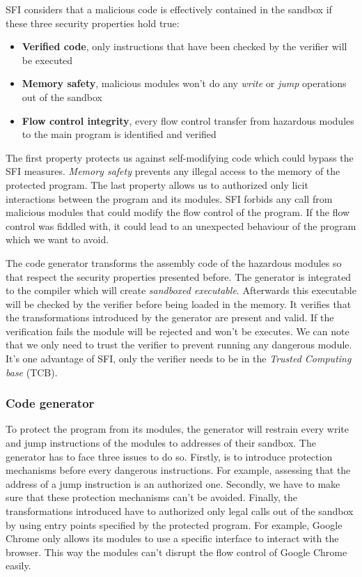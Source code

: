 \documentclass[11pt]{sdm}
\begin{document}
SFI considers that a malicious code is effectively contained in the sandbox if these three security properties hold true:
\begin{itemize}
	\item \textbf{Verified code}, only instructions that have been checked by the verifier will be executed 
	\item \textbf{Memory safety}, malicious modules won't do any \textit{write} or \textit{jump} operations out of the sandbox
	\item \textbf{Flow control integrity}, every flow control transfer from hazardous modules to the main program is identified and verified
\end{itemize}
The first property protects us against self-modifying code which could bypass the SFI measures. \textit{Memory safety} prevents any illegal access to the memory of the protected program. The last property allows us to authorized only licit interactions between the program and its modules. SFI forbids any call from malicious modules that could modify the flow control of the program. If the flow control was fiddled with, it could lead to an unexpected behaviour of the program which we want to avoid.

The code generator transforms the assembly code of the hazardous modules so that respect the security properties presented before. The generator is integrated to the compiler which will create \textit{sandboxed executable}. Afterwards this executable will be checked by the verifier before being loaded in the memory. 
It verifies that the transformations introduced by the generator are present and valid. If the verification fails the module will be rejected and won't be executes. We can note that we only need to trust the verifier to prevent running any dangerous module. It's one advantage of SFI, only the verifier needs to be in the \textit{Trusted Computing base} (TCB).


\subsubsection{Code generator}
\label{ssub:Code generator}
To protect the program from its modules, the generator will restrain every write and jump instructions of the modules to addresses of their sandbox.
The generator has to face three issues to do so. Firstly, is to introduce protection mechanisms before every dangerous instructions. For example, assessing that the address of a jump instruction is an authorized one.
Secondly, we have to make sure that these protection mechanisms can't be avoided. 
Finally, the transformations introduced have to authorized only legal calls out of the sandbox by using entry points specified by the protected program. For example, Google Chrome only allows its modules to use a specific interface to interact with the browser. This way the modules can't disrupt the flow control of Google Chrome easily.
\end{document}
